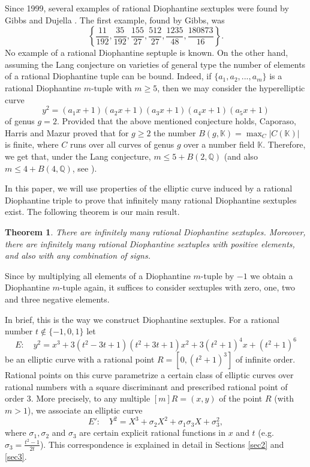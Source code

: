 \documentclass[11pt]{amsart}
\theoremstyle{plain}
\newtheorem{theorem}{Theorem}
\theoremstyle{remark}
\begin{document}
Since 1999, several examples of rational Diophantine sextuples were found by Gibbs \cite{Gibbs1,Gibbs2} and Dujella \cite{D-sex}. The first example, found by Gibbs, was
$$
\left\{ \frac{11}{192}, \frac{35}{192}, \frac{155}{27}, \frac{512}{27}, \frac{1235}{48}, \frac{180873}{16} \right\}.
$$
No example of a rational Diophantine septuple is known. On the other hand, assuming the Lang conjecture on varieties of general type the number of elements of a rational Diophantine tuple can be bound. Indeed, if $\{a_1,a_2,...,a_m\}$ is a rational Diophantine $m$-tuple with $m\ge 5$, then we may consider the hyperelliptic curve
$$
y^2=(a_1x+1)(a_2x+1)(a_3x+1)(a_4x+1)(a_5x+1)
$$
of genus $g=2$. Provided that the above mentioned conjecture holds, Caporaso, Harris and Mazur \cite{C-H-M} proved that for $g\ge 2$ the number  $B(g,\mathbb{K})=\max_{C} |C(\mathbb{K})|$ is finite, where $C$ runs over all curves of genus $g$ over a number field $\mathbb{K}$. Therefore, we get that, under the Lang conjecture, $m \leq 5+B(2,\mathbb{Q})$ (and also  $m\leq 4+B(4,\mathbb{Q})$, see \cite{P-H-Z}).

In this paper, we will use properties of the elliptic curve induced by a rational Diophantine triple to prove that infinitely many rational Diophantine sextuples exist. The following theorem is our main result.
\begin{theorem}
\label{tm1}
There are infinitely many rational Diophantine sextuples. Moreover, there are infinitely many rational Diophantine sextuples with positive elements, and also with any combination of signs.
\end{theorem}
\noindent Since by multiplying all elements of a Diophantine $m$-tuple by $-1$ we obtain a Diophantine $m$-tuple again, it suffices to consider sextuples with zero, one, two and three negative elements.

In brief, this is the way we construct Diophantine sextuples. For a rational number $t\notin \{-1,0,1\}$ let
\begin{equation}\label{eq:E}
E:\quad y^2=x^3+3(t^2-3t+1)(t^2+3t+1)x^2+3(t^2+1)^4x+(t^2+1)^6
\end{equation}
be an elliptic curve with a rational point $R=[0,(t^2+1)^3]$ of infinite order. Rational points on this curve parametrize a certain class of elliptic curves over rational numbers with a square discriminant and prescribed rational point of order $3$. More precisely, to any multiple $[m]R=(x,y)$ of the point $R$ (with $m>1$), we associate an elliptic curve
$$
E':\quad Y^2=X^3+ \sigma_2 X^2 + \sigma_1\sigma_3 X + \sigma_3^2,
$$
where $\sigma_1, \sigma_2$ and $\sigma_3$ are certain explicit rational functions in $x$ and $t$ (e.g. $\sigma_3=\frac{t^2-1}{2t}$). This correspondence is explained in detail in Sections \ref{sec2} and \ref{sec3}.
\end{document}
